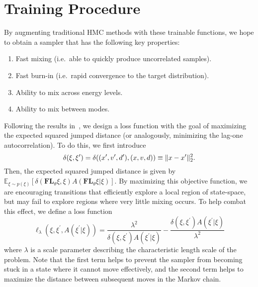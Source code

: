 \section{Training Procedure}%
\label{sec:training_procedure}

%
By augmenting traditional HMC methods with these trainable functions, we hope
to obtain a sampler that has the following key properties:
%
\begin{enumerate}
    \item Fast mixing (i.e.\ able to quickly produce uncorrelated samples).
    \item Fast burn-in (i.e.\ rapid convergence to the target distribution).
    \item Ability to mix across energy levels.
    \item Ability to mix between modes.
\end{enumerate}
%
Following the results in~\cite{10.2307/24308995}, we design a loss function
with the goal of maximizing the expected squared jumped distance (or
analogously, minimizing the lag-one autocorrelation).
%
To do this, we first introduce 
\begin{equation}
  \delta(\xi, {\xi^{\prime}}) = \delta((x^{\prime}, v^{\prime}, d^{\prime}), (x, v, d))
  \equiv \| x - x^{\prime}\|^2_2.  \label{eq:metric_orig}
\end{equation}
%
Then, the expected squared jumped distance is given by $\mathbb{E}_{\xi\sim
p(\xi)} \left[\delta(\mathbf{FL}_{\theta}\xi, \xi) A(\mathbf{FL}_{\theta}\xi |
\xi)\right]$.
%
By maximizing this objective function, we are encouraging transitions that
efficiently explore a local region of state-space, but may fail to explore
regions where very little mixing occurs.
%
To help combat this effect, we define a loss function
%
\begin{equation}
    \ell_{\lambda}(\xi, \xi^{\prime}, A(\xi^{\prime}|\xi)) =
        \frac{\lambda^2}{\delta(\xi,\xi^{\prime}) A(\xi^{\prime}|\xi)} -
        \frac{\delta(\xi,\xi^{\prime}) A(\xi^{\prime}|\xi)}{\lambda^2}
    \label{eq:loss_ell}
\end{equation}
%
where $\lambda$ is a scale parameter describing the characteristic length scale
of the problem.
%
Note that the first term helps to prevent the sampler from becoming stuck in a
state where it cannot move effectively, and the second term helps to maximize
the distance between subsequent moves in the Markov chain.  

